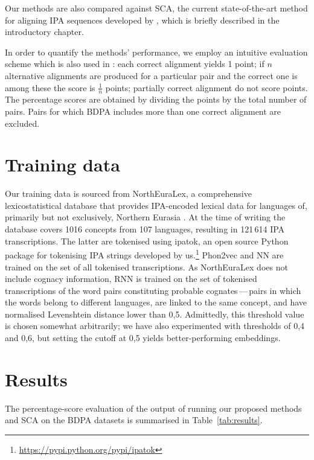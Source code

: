 \documentclass[a4paper]{report}
\begin{document}
Our methods are also compared against SCA, the current state-of-the-art method for aligning IPA sequences developed by \citet{2012_List},
which is briefly described in the introductory chapter.

In order to quantify the methods' performance, we employ an intuitive evaluation scheme which is also used in \citet{2002_Kondrak_Hirst}:
each correct alignment yields 1 point;
if $n$ alternative alignments are produced for a particular pair and the correct one is among these the score is $\frac{1}{n}$ points;
partially correct alignment do not score points.
The percentage scores are obtained by dividing the points by the total number of pairs.
Pairs for which BDPA includes more than one correct alignment are excluded.


\section{Training data}

Our training data is sourced from NorthEuraLex, a comprehensive lexicostatistical database
that provides IPA-encoded lexical data for languages of, primarily but not exclusively, Northern Eurasia \citep{2017_Dellert_Jäger}.
At the time of writing the database covers 1016 concepts from 107 languages, resulting in 121\,614 IPA transcriptions.
The latter are tokenised using ipatok, an open source Python package for tokenising IPA strings developed by us.\footnote{\url{https://pypi.python.org/pypi/ipatok}}
Phon2vec and NN are trained on the set of all tokenised transcriptions.
As NorthEuraLex does not include cognacy information, RNN is trained on the set of tokenised transcriptions of the word pairs constituting probable cognates\,---\,pairs
in which the words belong to different languages, are linked to the same concept, and have normalised Levenshtein distance lower than 0,5.
Admittedly, this threshold value is chosen somewhat arbitrarily;
we have also experimented with thresholds of 0,4 and 0,6, but setting the cutoff at 0,5 yields better-performing embeddings.


\section{Results}

The percentage-score evaluation of the output of running our proposed methods and SCA on the BDPA datasets is summarised in Table~\ref{tab:results}.
\end{document}
